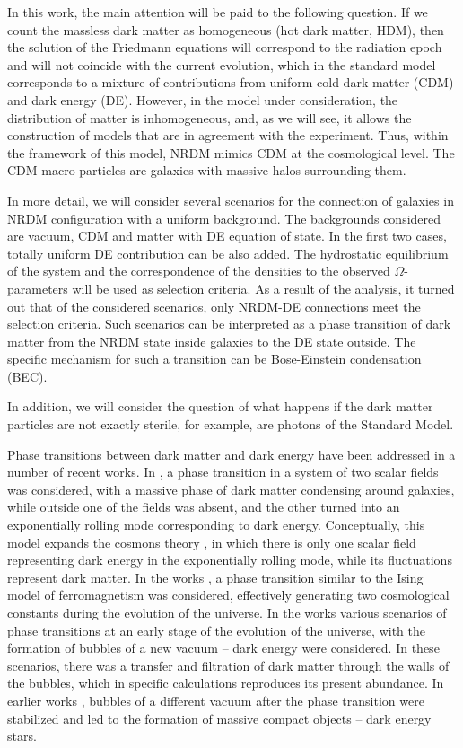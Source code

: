 \documentclass{article}
\begin{document}
In this work, the main attention will be paid to the following question. If we count the massless dark matter as homogeneous (hot dark matter, HDM), then the solution of the Friedmann equations will correspond to the radiation epoch and will not coincide with the current evolution, which in the standard model corresponds to a mixture of contributions from uniform cold dark matter (CDM) and dark energy (DE). However, in the model under consideration, the distribution of matter is inhomogeneous, and, as we will see, it allows the construction of models that are in agreement with the experiment. Thus, within the framework of this model, NRDM mimics CDM at the cosmological level. The CDM macro-particles are galaxies with massive halos surrounding them. 

In more detail, we will consider several scenarios for the connection of galaxies in NRDM configuration with a uniform background. The backgrounds considered are vacuum, CDM and matter with  DE equation of state. In the first two cases, totally uniform DE contribution can be also added. The hydrostatic equilibrium of the system and the correspondence of the densities to the observed $ \Omega $-parameters will be used as selection criteria. As a result of the analysis, it turned out that of the considered scenarios, only NRDM-DE connections meet the selection criteria. Such scenarios can be interpreted as a phase transition of dark matter from the NRDM state inside galaxies to the DE state outside. The specific mechanism for such a transition can be Bose-Einstein condensation (BEC).

In addition, we will consider the question of what happens if the dark matter particles are not exactly sterile, for example, are photons of the Standard Model.

Phase transitions between dark matter and dark energy have been addressed in a number of recent works. In \cite {1907.06353}, a phase transition in a system of two scalar fields was considered, with a massive phase of dark matter condensing around galaxies, while outside one of the fields was absent, and the other turned into an exponentially rolling mode corresponding to dark energy. Conceptually, this model expands the cosmons theory \cite {hep-ph/0108266}, in which there is only one scalar field representing dark energy in the exponentially rolling mode, while its fluctuations represent dark matter. In the works \cite {1808.02472,2012.01407}, a phase transition similar to the Ising model of ferromagnetism was considered, effectively generating two cosmological constants during the evolution of the universe. In the works \cite {2008.04430,1912.02830,1911.12342,1906.01823} various scenarios of phase transitions at an early stage of the evolution of the universe, with the formation of bubbles of a new vacuum -- dark energy were considered. In these scenarios, there was a transfer and filtration of dark matter through the walls of the bubbles, which in specific calculations reproduces its present abundance. In earlier works \cite {astro-ph/0503200, gr-qc/0012094}, bubbles of a different vacuum after the phase transition were stabilized and led to the formation of massive compact objects -- dark energy stars. 
\end{document}
